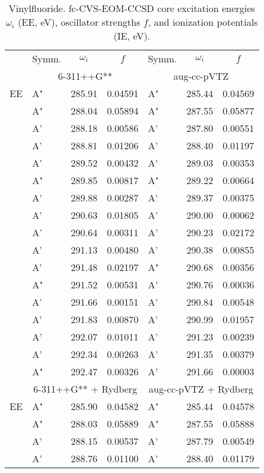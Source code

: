 \documentclass[journal=jctcce,manuscript=article]{achemso}
\begin{document}
\begin{table}[H]
\caption{Vinylfluoride. fc-CVS-EOM-CCSD core excitation energies $\omega_i$ (EE, eV), oscillator strengths $f$, and ionization potentials (IE, eV). \label{Tab:Vinylfluoride:C}}
\scriptsize
\begin{tabular}{l|lcc|lcc}
\cline{2-7}
& Symm. & $\omega_i$ & $f$ & Symm. & $\omega_i$ & $f$ \\
\cline{2-7}
& \multicolumn{3}{c|}{6-311++G**}
& \multicolumn{3}{c}{aug-cc-pVTZ} \\
\hline
EE
& A" & 285.91 & 0.04591	& A" & 285.44 & 0.04569 \\
& A" & 288.04 & 0.05894	& A" & 287.55 & 0.05877 \\
& A' & 288.18 & 0.00586	& A' & 287.80 & 0.00551 \\
& A' & 288.81 & 0.01206	& A' & 288.40 & 0.01197 \\
& A' & 289.52 & 0.00432	& A' & 289.03 & 0.00353 \\
& A" & 289.85 & 0.00817	& A" & 289.22 & 0.00664 \\
& A' & 289.88 & 0.00287	& A' & 289.37 & 0.00375 \\
& A' & 290.63 & 0.01805	& A' & 290.00 & 0.00062 \\
& A' & 290.64 & 0.00311	& A' & 290.23 & 0.02172 \\
& A' & 291.13 & 0.00480	& A' & 290.38 & 0.00855 \\
& A' & 291.48 & 0.02197	& A" & 290.68 & 0.00356 \\
& A" & 291.52 & 0.00531	& A' & 290.76 & 0.00036 \\
& A' & 291.66 & 0.00151	& A' & 290.84 & 0.00548 \\
& A' & 291.83 & 0.00870	& A' & 290.99 & 0.01957 \\
& A' & 292.07 & 0.01011	& A' & 291.23 & 0.00239 \\
& A' & 292.34 & 0.00263	& A' & 291.35 & 0.00379 \\
& A" & 292.47 & 0.00326	& A' & 291.66 & 0.00003 \\
\cline{2-7}
& \multicolumn{3}{c|}{6-311++G** + Rydberg} 
& \multicolumn{3}{c}{aug-cc-pVTZ + Rydberg} \\
\hline
EE
& A" & 285.90 & 0.04582	& A" & 285.44 & 0.04578 \\
& A" & 288.03 & 0.05889	& A" & 287.55 & 0.05888 \\
& A' & 288.15 & 0.00537	& A' & 287.79 & 0.00549 \\
& A' & 288.76 & 0.01100	& A' & 288.40 & 0.01179 \\

\end{tabular}
\end{table}
\end{document}
